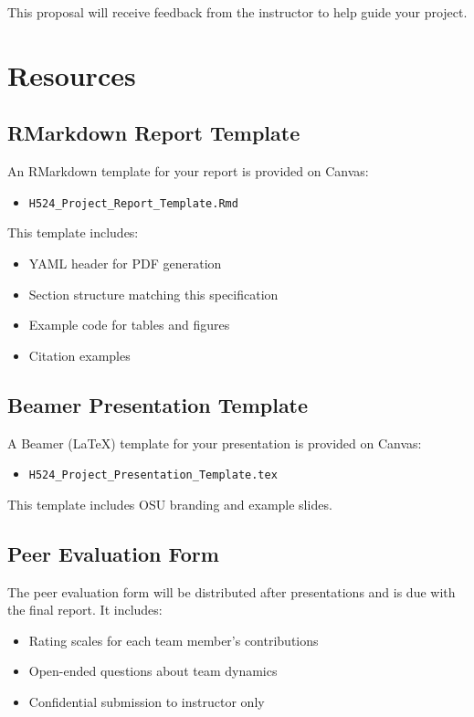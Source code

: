 \documentclass[11pt]{article}
\begin{document}
This proposal will receive feedback from the instructor to help guide your project.

\section{Resources}

\subsection{RMarkdown Report Template}

An RMarkdown template for your report is provided on Canvas:
\begin{itemize}
\item \texttt{H524\_Project\_Report\_Template.Rmd}
\end{itemize}

This template includes:
\begin{itemize}
\item YAML header for PDF generation
\item Section structure matching this specification
\item Example code for tables and figures
\item Citation examples
\end{itemize}

\subsection{Beamer Presentation Template}

A Beamer (LaTeX) template for your presentation is provided on Canvas:
\begin{itemize}
\item \texttt{H524\_Project\_Presentation\_Template.tex}
\end{itemize}

This template includes OSU branding and example slides.

\subsection{Peer Evaluation Form}

The peer evaluation form will be distributed after presentations and is due with the final report. It includes:
\begin{itemize}
\item Rating scales for each team member's contributions
\item Open-ended questions about team dynamics
\item Confidential submission to instructor only
\end{itemize}
\end{document}

